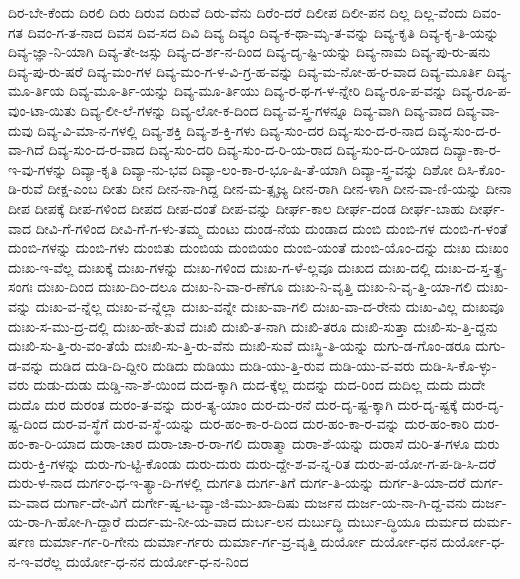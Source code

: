 {ದಿರ-ಬೇ-ಕೆಂದು
ದಿರಲಿ
ದಿರು
ದಿರುವ
ದಿರುವೆ
ದಿರು-ವೆನು
ದಿರೆಂ-ದರೆ
ದಿಲೀಪ
ದಿಲೀ-ಪನ
ದಿಲ್ಲ
ದಿಲ್ಲ-ವೆಂದು
ದಿವಂ-ಗತ
ದಿವಂ-ಗ-ತ-ನಾದ
ದಿವಸ
ದಿವ-ಸದ
ದಿವಿ
ದಿವ್ಯ
ದಿವ್ಯಂ
ದಿವ್ಯ-ಕ-ಥಾ-ಮೃ-ತ-ವನ್ನು
ದಿವ್ಯ-ಕೃತಿ
ದಿವ್ಯ-ಕೃ-ತಿ-ಯನ್ನು
ದಿವ್ಯ-ಜ್ಞಾ-ನಿ-ಯಾಗಿ
ದಿವ್ಯ-ತೇ-ಜಸ್ಸು
ದಿವ್ಯ-ದ-ರ್ಶ-ನ-ದಿಂದ
ದಿವ್ಯ-ದೃ-ಷ್ಟಿ-ಯನ್ನು
ದಿವ್ಯ-ನಾಮ
ದಿವ್ಯ-ಪು-ರು-ಷನು
ದಿವ್ಯ-ಪು-ರು-ಷರೆ
ದಿವ್ಯ-ಮಂ-ಗಳ
ದಿವ್ಯ-ಮಂ-ಗ-ಳ-ವಿ-ಗ್ರ-ಹ-ವನ್ನು
ದಿವ್ಯ-ಮ-ನೋ-ಹ-ರ-ವಾದ
ದಿವ್ಯ-ಮೂರ್ತಿ
ದಿವ್ಯ-ಮೂ-ರ್ತಿಯ
ದಿವ್ಯ-ಮೂ-ರ್ತಿ-ಯನ್ನು
ದಿವ್ಯ-ಮೂ-ರ್ತಿಯು
ದಿವ್ಯ-ರ-ಥ-ಗ-ಳ-ನ್ನೇರಿ
ದಿವ್ಯ-ರೂ-ಪ-ವನ್ನು
ದಿವ್ಯ-ರೂ-ಪ-ವುಂ-ಟಾ-ಯಿತು
ದಿವ್ಯ-ಲೀ-ಲೆ-ಗಳನ್ನು
ದಿವ್ಯ-ಲೋ-ಕ-ದಿಂದ
ದಿವ್ಯ-ವ-ಸ್ತ್ರ-ಗಳನ್ನೂ
ದಿವ್ಯ-ವಾಗಿ
ದಿವ್ಯ-ವಾದ
ದಿವ್ಯ-ವಾ-ದುವು
ದಿವ್ಯ-ವಿ-ಮಾ-ನ-ಗಳಲ್ಲಿ
ದಿವ್ಯ-ಶಕ್ತಿ
ದಿವ್ಯ-ಶ-ಕ್ತಿ-ಗಳು
ದಿವ್ಯ-ಸುಂ-ದರ
ದಿವ್ಯ-ಸುಂ-ದ-ರ-ನಾದ
ದಿವ್ಯ-ಸುಂ-ದ-ರ-ವಾ-ಗಿದೆ
ದಿವ್ಯ-ಸುಂ-ದ-ರ-ವಾದ
ದಿವ್ಯ-ಸುಂ-ದರಿ
ದಿವ್ಯ-ಸುಂ-ದ-ರಿ-ಯ-ರಾದ
ದಿವ್ಯ-ಸುಂ-ದ-ರಿ-ಯಾದ
ದಿವ್ಯಾ-ಕಾ-ರ-ಇ-ವು-ಗಳನ್ನು
ದಿವ್ಯಾ-ಕೃತಿ
ದಿವ್ಯಾ-ನು-ಭವ
ದಿವ್ಯಾ-ಲಂ-ಕಾ-ರ-ಭೂ-ಷಿ-ತೆ-ಯಾಗಿ
ದಿವ್ಯಾ-ಸ್ತ್ರ-ವನ್ನು
ದಿಶೋ
ದಿಸಿ-ಕೊಂ-ಡಿ-ರುವೆ
ದೀಕ್ಷ-ಎಂಬ
ದೀತು
ದೀನ
ದೀನ-ನಾ-ಗಿದ್ದ
ದೀನ-ಮ-ತ್ಸೃಜ್ಯ
ದೀನ-ರಾಗಿ
ದೀನ-ಳಾಗಿ
ದೀನ-ವಾ-ಣಿ-ಯನ್ನು
ದೀನಾ
ದೀಪ
ದೀಪಕ್ಕೆ
ದೀಪ-ಗಳಿಂದ
ದೀಪದ
ದೀಪ-ದಂತೆ
ದೀಪ-ವನ್ನು
ದೀರ್ಘ-ಕಾಲ
ದೀರ್ಘ-ದಂಡ
ದೀರ್ಘ-ಬಾಹು
ದೀರ್ಘ-ವಾದ
ದೀವಿ-ಗೆ-ಗಳಿಂದ
ದೀವಿ-ಗೆ-ಗ-ಳು-ತಮ್ಮ
ದುಂಟು
ದುಂಡ-ನೆಯ
ದುಂಡಾದ
ದುಂಬಿ
ದುಂಬಿ-ಗಳ
ದುಂಬಿ-ಗ-ಳಂತೆ
ದುಂಬಿ-ಗಳನ್ನು
ದುಂಬಿ-ಗಳು
ದುಂಬಿತು
ದುಂಬಿಯ
ದುಂಬಿಯಂ
ದುಂಬಿ-ಯಂತೆ
ದುಂಬಿ-ಯೊಂ-ದನ್ನು
ದುಃಖ
ದುಃಖಂ
ದುಃಖ-ಇ-ವೆಲ್ಲ
ದುಃಖಕ್ಕೆ
ದುಃಖ-ಗಳನ್ನು
ದುಃಖ-ಗಳಿಂದ
ದುಃಖ-ಗ-ಳೆ-ಲ್ಲವೂ
ದುಃಖದ
ದುಃಖ-ದಲ್ಲಿ
ದುಃಖ-ದ-ಸ್ತ-ತ್ಪ್ರ-ಸಂಗಃ
ದುಃಖ-ದಿಂದ
ದುಃಖ-ದಿಂ-ದಲೂ
ದುಃಖ-ನಿ-ವಾ-ರ-ಣೆಗೂ
ದುಃಖ-ನಿ-ವೃತ್ತಿ
ದುಃಖ-ನಿ-ವೃ-ತ್ತಿ-ಯಾ-ಗಲಿ
ದುಃಖ-ವನ್ನು
ದುಃಖ-ವ-ನ್ನೆಲ್ಲ
ದುಃಖ-ವ-ನ್ನೆಲ್ಲಾ
ದುಃಖ-ವನ್ನೇ
ದುಃಖ-ವಾ-ಗಲಿ
ದುಃಖ-ವಾ-ದ-ರೇನು
ದುಃಖ-ವಿಲ್ಲ
ದುಃಖವೂ
ದುಃಖ-ಸ-ಮು-ದ್ರ-ದಲ್ಲಿ
ದುಃಖ-ಹೇ-ತುವೆ
ದುಃಖಿ
ದುಃಖಿ-ತ-ನಾಗಿ
ದುಃಖಿ-ತರೂ
ದುಃಖಿ-ಸುತ್ತಾ
ದುಃಖಿ-ಸು-ತ್ತಿ-ದ್ದನು
ದುಃಖಿ-ಸು-ತ್ತಿ-ರು-ವಂ-ತೆಯೆ
ದುಃಖಿ-ಸು-ತ್ತಿ-ರು-ವೆನು
ದುಃಖಿ-ಸುವೆ
ದುಃಸ್ಥಿ-ತಿ-ಯನ್ನು
ದುಗು-ಡ-ಗೊಂ-ಡರೂ
ದುಗು-ಡ-ವನ್ನು
ದುಡಿದ
ದುಡಿ-ದಿ-ದ್ದೀರಿ
ದುಡಿದು
ದುಡಿಯು
ದುಡಿ-ಯು-ತ್ತಿ-ರುವ
ದುಡಿ-ಯು-ವ-ವರು
ದುಡಿ-ಸಿ-ಕೊ-ಳ್ಳು-ವರು
ದುಡು-ದುಡು
ದುಡ್ಡಿ-ನಾ-ಶೆ-ಯಿಂದ
ದುದ-ಕ್ಕಾಗಿ
ದುದ-ಕ್ಕೆಲ್ಲ
ದುದನ್ನು
ದುದ-ರಿಂದ
ದುದಿಲ್ಲ
ದುದು
ದುದೇ
ದುದೊ
ದುರ
ದುರಂತ
ದುರಂ-ತ-ವನ್ನು
ದುರ-ತ್ಯ-ಯಾಂ
ದುರ-ದು-ರನೆ
ದುರ-ದೃ-ಷ್ಟ-ಕ್ಕಾಗಿ
ದುರ-ದೃ-ಷ್ಟಕ್ಕೆ
ದುರ-ದೃ-ಷ್ಟ-ದಿಂದ
ದುರ-ವ-ಸ್ಥೆಗೆ
ದುರ-ವ-ಸ್ಥೆ-ಯನ್ನು
ದುರ-ಹಂ-ಕಾ-ರ-ದಿಂದ
ದುರ-ಹಂ-ಕಾ-ರ-ವನ್ನು
ದುರ-ಹಂ-ಕಾರಿ
ದುರ-ಹಂ-ಕಾ-ರಿ-ಯಾದ
ದುರಾ-ಚಾರ
ದುರಾ-ಚಾ-ರ-ರಾ-ಗಲಿ
ದುರಾತ್ಮಾ
ದುರಾ-ಶೆ-ಯನ್ನು
ದುರಾಸೆ
ದುರಿ-ತ-ಗಳೂ
ದುರು
ದುರು-ಕ್ತಿ-ಗಳನ್ನು
ದುರು-ಗು-ಟ್ಟಿ-ಕೊಂಡು
ದುರು-ದುರು
ದುರು-ದ್ದೇ-ಶ-ವ-ನ್ನ-ರಿತ
ದುರು-ಪ-ಯೋ-ಗ-ಪ-ಡಿ-ಸಿ-ದರೆ
ದುರು-ಳ-ನಾದ
ದುರ್ಗಂ-ಧ-ಇ-ತ್ಯಾ-ದಿ-ಗಳಲ್ಲಿ
ದುರ್ಗತಿ
ದುರ್ಗ-ತಿಗೆ
ದುರ್ಗ-ತಿ-ಯನ್ನು
ದುರ್ಗ-ತಿ-ಯಾ-ದರೆ
ದುರ್ಗ-ಮ-ವಾದ
ದುರ್ಗಾ-ದೇ-ವಿಗೆ
ದುರ್ಗೇ-ಷ್ವ-ಟ-ವ್ಯಾ-ಜಿ-ಮು-ಖಾ-ದಿಷು
ದುರ್ಜನ
ದುರ್ಜ-ಯ-ನಾ-ಗಿ-ದ್ದ-ವನು
ದುರ್ಜ-ಯ-ರಾ-ಗಿ-ಹೋ-ಗಿ-ದ್ದಾರೆ
ದುರ್ದ-ಮ-ನೀ-ಯ-ವಾದ
ದುರ್ಬ-ಲನ
ದುರ್ಬುದ್ಧಿ
ದುರ್ಬು-ದ್ಧಿಯೂ
ದುರ್ಮದ
ದುರ್ಮ-ರ್ಷಣ
ದುರ್ಮಾ-ರ್ಗ-ರಿ-ಗೇನು
ದುರ್ಮಾ-ರ್ಗರು
ದುರ್ಮಾ-ರ್ಗ-ವ್ರ-ವೃತ್ತಿ
ದುರ್ಯೋ
ದುರ್ಯೋ-ಧನ
ದುರ್ಯೋ-ಧ-ನ-ಇ-ವರೆಲ್ಲ
ದುರ್ಯೋ-ಧ-ನನ
ದುರ್ಯೋ-ಧ-ನ-ನಿಂದ
}
